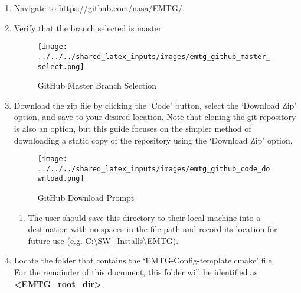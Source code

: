 
\begin{enumerate}
	\item Navigate to \url{https://github.com/nasa/EMTG/}.
	\item Verify that the branch selected is master
		\begin{figure}[H]
			\centering
			\texttt{[image: ../../../shared\_latex\_inputs/images/emtg\_github\_master\_select.png]}
			\caption{GitHub Master Branch Selection}
		\end{figure}
	\item Download the zip file by clicking the ‘Code’ button, select the ‘Download Zip’ option, and save to your desired location. Note that cloning the git repository is also an option, but this guide focuses on the simpler method of downloading a static copy of the repository using the `Download Zip' option. 
		\begin{figure}[H]
			\centering
			\texttt{[image: ../../../shared\_latex\_inputs/images/emtg\_github\_code\_download.png]}
			\caption{GitHub Download Prompt}
		\end{figure}
	\begin{enumerate}
		\item The user should save this directory to their local machine into a destination with no spaces in the file path and record its location for future use (e.g. C:\textbackslash SW\_Installs\textbackslash EMTG).
	\end{enumerate}
	\item Locate the folder that contains the ‘EMTG-Config-template.cmake’ file. \\ For the remainder of this document, this folder will be identified as \textbf{\textless EMTG\_root\_dir\textgreater}	
\end{enumerate}
